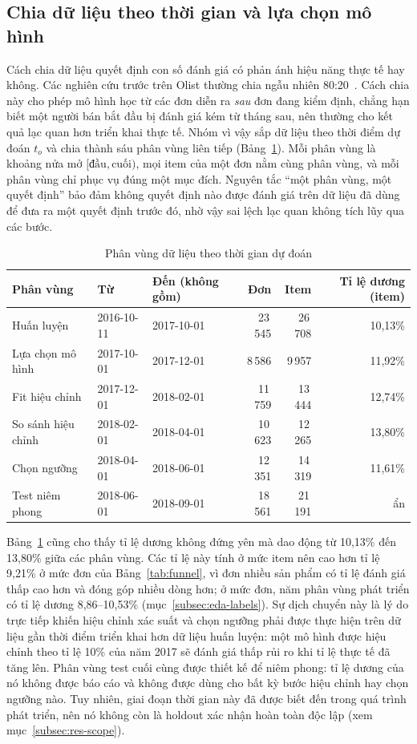 \documentclass[12pt,a4paper]{report}
\begin{document}
\subsection{Chia dữ liệu theo thời gian và lựa chọn mô hình}

Cách chia dữ liệu quyết định con số đánh giá có phản ánh hiệu năng thực tế hay không. Các nghiên cứu trước trên Olist thường chia ngẫu nhiên 80:20~\cite{orman2026}. Cách chia này cho phép mô hình học từ các đơn diễn ra \emph{sau} đơn đang kiểm định, chẳng hạn biết một người bán bắt đầu bị đánh giá kém từ tháng sau, nên thường cho kết quả lạc quan hơn triển khai thực tế. Nhóm vì vậy sắp dữ liệu theo thời điểm dự đoán $t_o$ và chia thành sáu phân vùng liên tiếp (Bảng~\ref{tab:split}). Mỗi phân vùng là khoảng nửa mở $[\text{đầu}, \text{cuối})$, mọi item của một đơn nằm cùng phân vùng, và mỗi phân vùng chỉ phục vụ đúng một mục đích. Nguyên tắc ``một phân vùng, một quyết định'' bảo đảm không quyết định nào được đánh giá trên dữ liệu đã dùng để đưa ra một quyết định trước đó, nhờ vậy sai lệch lạc quan không tích lũy qua các bước.

\begin{table}[htbp]\centering\small
\caption{Phân vùng dữ liệu theo thời gian dự đoán}\label{tab:split}
\begin{tabular}{lllrrr}
\toprule
Phân vùng & Từ & Đến (không gồm) & Đơn & Item & Tỉ lệ dương (item) \\
\midrule
Huấn luyện            & 2016-10-11 & 2017-10-01 & 23\,545 & 26\,708 & 10,13\% \\
Lựa chọn mô hình      & 2017-10-01 & 2017-12-01 &  8\,586 &  9\,957 & 11,92\% \\
Fit hiệu chỉnh        & 2017-12-01 & 2018-02-01 & 11\,759 & 13\,444 & 12,74\% \\
So sánh hiệu chỉnh    & 2018-02-01 & 2018-04-01 & 10\,623 & 12\,265 & 13,80\% \\
Chọn ngưỡng           & 2018-04-01 & 2018-06-01 & 12\,351 & 14\,319 & 11,61\% \\
Test niêm phong       & 2018-06-01 & 2018-09-01 & 18\,561 & 21\,191 & ẩn \\
\bottomrule
\end{tabular}
\end{table}

Bảng~\ref{tab:split} cũng cho thấy tỉ lệ dương không đứng yên mà dao động từ 10,13\% đến 13,80\% giữa các phân vùng. Các tỉ lệ này tính ở mức item nên cao hơn tỉ lệ 9,21\% ở mức đơn của Bảng~\ref{tab:funnel}, vì đơn nhiều sản phẩm có tỉ lệ đánh giá thấp cao hơn và đóng góp nhiều dòng hơn; ở mức đơn, năm phân vùng phát triển có tỉ lệ dương 8,86--10,53\% (mục~\ref{subsec:eda-labels}). Sự dịch chuyển này là lý do trực tiếp khiến hiệu chỉnh xác suất và chọn ngưỡng phải được thực hiện trên dữ liệu gần thời điểm triển khai hơn dữ liệu huấn luyện: một mô hình được hiệu chỉnh theo tỉ lệ 10\% của năm 2017 sẽ đánh giá thấp rủi ro khi tỉ lệ thực tế đã tăng lên. Phân vùng test cuối cùng được thiết kế để niêm phong: tỉ lệ dương của nó không được báo cáo và không được dùng cho bất kỳ bước hiệu chỉnh hay chọn ngưỡng nào. Tuy nhiên, giai đoạn thời gian này đã được biết đến trong quá trình phát triển, nên nó không còn là holdout xác nhận hoàn toàn độc lập (xem mục~\ref{subsec:res-scope}).
\end{document}
